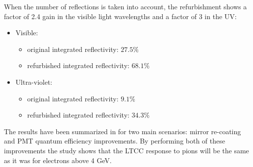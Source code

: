 When the number of reflections is taken into account, the refurbishment shows
a factor of 2.4 gain in the visible light wavelengths and a factor of 3 in the UV:


\begin{itemize}
	\item Visible:
	\begin{itemize}
		\item original integrated reflectivity: $27.5\%$
		\item refurbished integrated reflectivity: $68.1\%$
	\end{itemize}
	\item Ultra-violet:
	\begin{itemize}
		\item original integrated reflectivity: $9.1\%$
		\item refurbished integrated reflectivity: $34.3\%$
	\end{itemize}
\end{itemize}


The results have been summarized in  for two main scenarios: mirror re-coating and PMT quantum efficiency improvements.
By performing both of these improvements the study shows that the LTCC response to pions will be the same as it was for electrons above 4 GeV.

